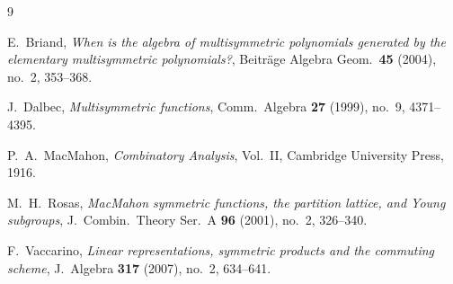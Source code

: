 \documentclass[11pt,a4paper]{article}
\theoremstyle{definition}
\theoremstyle{remark}
\begin{document}
\begin{thebibliography}{9}

E.~Briand, \emph{When is the algebra of multisymmetric polynomials generated by the elementary multisymmetric polynomials?}, Beitr\"age Algebra Geom.\ \textbf{45} (2004), no.~2, 353--368.

J.~Dalbec, \emph{Multisymmetric functions}, Comm.\ Algebra \textbf{27} (1999), no.~9, 4371--4395.

P.~A.~MacMahon, \emph{Combinatory Analysis}, Vol.~II, Cambridge University Press, 1916.

M.~H.~Rosas, \emph{MacMahon symmetric functions, the partition lattice, and Young subgroups}, J.\ Combin.\ Theory Ser.~A \textbf{96} (2001), no.~2, 326--340.

F.~Vaccarino, \emph{Linear representations, symmetric products and the commuting scheme}, J.\ Algebra \textbf{317} (2007), no.~2, 634--641.

\end{thebibliography}
\end{document}
